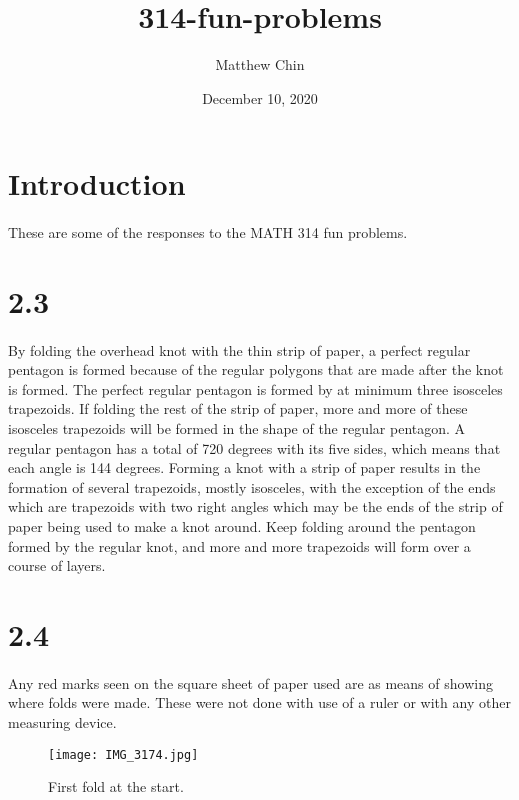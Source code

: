 \documentclass{article}
\title{314-fun-problems}
\author{Matthew Chin}
\date{December 10, 2020}
\begin{document}
\maketitle

\section{Introduction}
\paragraph{}These are some of the responses to the MATH 314 fun problems. 

\section{2.3}

\paragraph{}By folding the overhead knot with the thin strip of paper, a perfect regular pentagon is formed because of the regular polygons that are made after the knot is formed. The perfect regular pentagon is formed by at minimum three isosceles trapezoids. If folding the rest of the strip of paper, more and more of these isosceles trapezoids will be formed in the shape of the regular pentagon. A regular pentagon has a total of 720 degrees with its five sides, which means that each angle is 144 degrees. Forming a knot with a strip of paper results in the formation of several trapezoids, mostly isosceles, with the exception of the ends which are trapezoids with two right angles which may be the ends of the strip of paper being used to make a knot around. Keep folding around the pentagon formed by the regular knot, and more and more trapezoids will form over a course of layers. 

\section{2.4}
\paragraph{}Any red marks seen on the square sheet of paper used are as means of showing where folds were made. These were not done with use of a ruler or with any other measuring device. 

\begin{figure}[h]
    \centering
    \texttt{[image: IMG\_3174.jpg]}
    \caption{First fold at the start.}
    \label{fig:my_label}
\end{figure}
\end{document}
